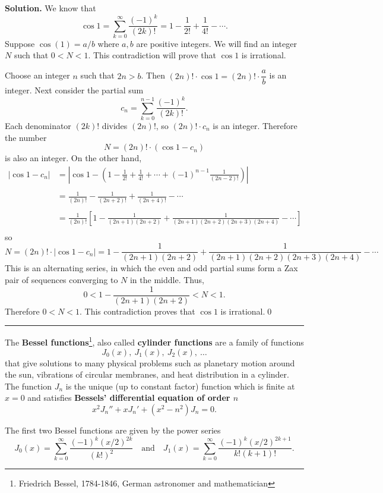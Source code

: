 \documentclass[12pt]{article}
\theoremstyle{definition}
\theoremstyle{remark}
\theoremstyle{definition}
\newenvironment{Solution}{\noindent\textbf{Solution.}}{}
\begin{document}
\begin{Solution} We know that 
\[\cos 1=\sum_{k=0}^\infty \frac{(-1)^k}{(2k)!}=1-\frac{1}{2!}+\frac{1}{4!}-\cdots.\]
Suppose $\cos(1)=a/b$ where $a,b$ are positive integers. 
We will find an integer $N$ such that $0<N<1$. This contradiction will prove that $\cos 1$ is irrational. 

 
Choose an integer $n$ such that $2n>b$. Then $(2n)!\cdot \cos 1=(2n)!\cdot \dfrac{a}{b}$ is an integer. Next consider the partial sum
\[c_n=\sum_{k=0}^{n-1}\dfrac{(-1)^k}{(2k)!}.\]
 Each denominator $(2k)!$ divides $(2n)!$, so $(2n)!\cdot c_n$ is an integer. Therefore the number 
\[N=(2n)!\cdot (\cos 1-c_n)\]
is also an integer. On the other hand,
\[\begin{split}
|\cos1-c_n|
&=\left |\cos1-\left(1-\frac{1}{2!}+\frac{1}{4!}+\cdots+(-1)^{n-1}\frac{1}{(2n-2)!}\right)\right|\\
&\\
&=\frac{1}{(2n)!}-\frac{1}{(2n+2)!}+\frac{1}{(2n+4)!}-\cdots\\
&\\
&=\frac{1}{(2n)!}\left[1-\frac{1}{(2n+1)(2n+2)}+\frac{1}{(2n+1)(2n+2)(2n+3)(2n+4)}-\cdots\right]\\
\end{split}
\]
so 
\[N=(2n)!\cdot |\cos1-c_n|=1-\frac{1}{(2n+1)(2n+2)}+\frac{1}{(2n+1)(2n+2)(2n+3)(2n+4)}-\cdots\]
This is an alternating series, in which the even and odd partial sums form a Zax pair of sequences converging to $N$ in the middle. Thus, 
\[0<1-\frac{1}{(2n+1)(2n+2)}< N<1.\]
Therefore $0<N<1$. This contradiction proves that  $\cos 1$ is irrational.\qed


\end{Solution}

\newpage
\rule{\textwidth}{1pt}
The {\bf Bessel functions}\footnote{Friedrich Bessel, 1784-1846, German astronomer and mathematician}, also called {\bf cylinder functions} are a family of functions 
\[J_0(x),\  J_1(x),\  J_2(x),\ \dots\]
 that give solutions to many physical problems such as planetary motion around the sun, vibrations of circular membranes, and heat distribution in a cylinder. The function $J_n$ is the unique (up  to constant factor) function which is finite at $x=0$ and satisfies {\bf Bessels' differential equation of order $n$}
\[x^2J_n''+xJ_n'+(x^2-n^2)J_n=0.\]


The first two Bessel functions are given by the power series
\[
J_0(x)=\sum_{k=0}^\infty\frac{(-1)^k(x/2)^{2k}}{(k!)^2}\quad\text{and}\quad 
J_1(x)=\sum_{k=0}^\infty\frac{(-1)^k(x/2)^{2k+1}}{k!(k+1)!}.
\]
\end{document}
